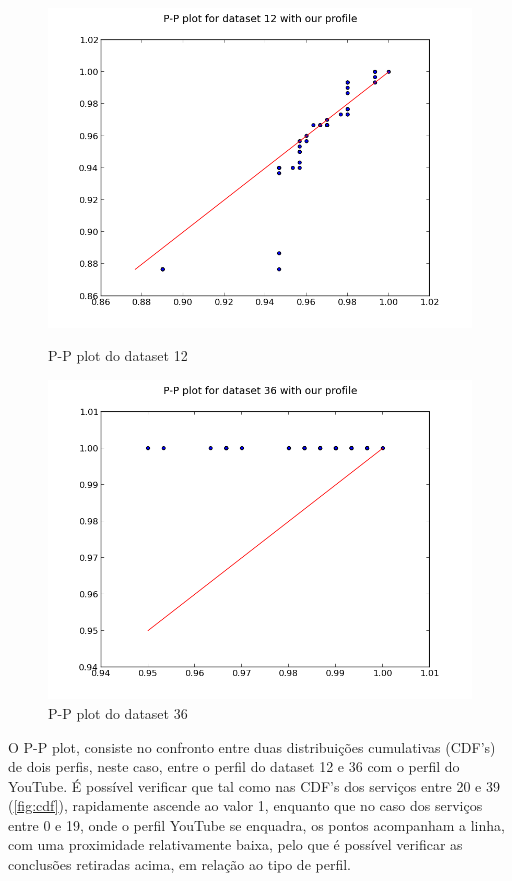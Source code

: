 \documentclass[pdftex,12pt,a4paper]{report}
\begin{document}
\newpage
\begin{figure}[!htb]
  \centering
  \begin{minipage}[b]{0.4\textwidth}
    \includegraphics[width=\textwidth]{qq_pp/pp_plot_12.png}
    \caption{P-P plot do dataset 12}
    \label{fig:pp_12}
  \end{minipage}
  \hfill
  \begin{minipage}[b]{0.4\textwidth}
    \includegraphics[width=\textwidth]{qq_pp/pp_plot_36.png}
    \caption{P-P plot do dataset 36}
    \label{fig:pp_36}
  \end{minipage}
\end{figure}

O P-P plot, consiste no confronto entre duas distribuições cumulativas (CDF's) de dois perfis, neste caso, entre o perfil do dataset 12 e 36 com o perfil do YouTube. É possível verificar que tal como nas CDF's dos serviços entre 20 e 39 (\ref{fig:cdf}), rapidamente ascende ao valor 1, enquanto que no caso dos serviços entre 0 e 19, onde o perfil YouTube se enquadra, os pontos acompanham a linha, com uma proximidade relativamente baixa, pelo que é possível verificar as conclusões retiradas acima, em relação ao tipo de perfil.
\end{document}
